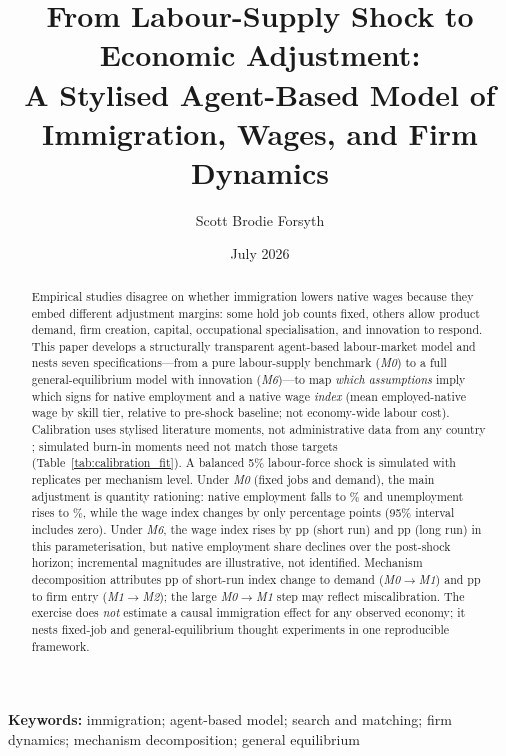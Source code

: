 \documentclass[11pt,a4paper]{article}
\title{%
  From Labour-Supply Shock to Economic Adjustment:\\
  A Stylised Agent-Based Model of Immigration, Wages, and Firm Dynamics}
\author{Scott Brodie Forsyth}
\date{July 2026}
\begin{document}
\maketitle



\begin{abstract}
\noindent
Empirical studies disagree on whether immigration lowers native wages because they embed different adjustment margins: some hold job counts fixed, others allow product demand, firm creation, capital, occupational specialisation, and innovation to respond.
This paper develops a structurally transparent agent-based labour-market model and nests seven specifications---from a pure labour-supply benchmark (\emph{M0}) to a full general-equilibrium model with innovation (\emph{M6})---to map \emph{which assumptions} imply which signs for native employment and a native wage \emph{index} (mean employed-native wage by skill tier, relative to pre-shock baseline; not economy-wide labour cost).
Calibration uses stylised literature moments, not administrative data from any country \citep{borjas2016,dustmann2013,oecd2024entrepreneurship,peri2016}; simulated burn-in moments need not match those targets (Table~\ref{tab:calibration_fit}).
A balanced 5\% labour-force shock is simulated with \NReplicates{} replicates per mechanism level.
Under \emph{M0} (fixed jobs and demand), the main adjustment is quantity rationing: native employment falls to \MZeroEmpShort{}\% and unemployment rises to \MZeroUnempShort{}\%, while the wage index changes by only \MZeroShortWage{} percentage points (95\% interval includes zero).
Under \emph{M6}, the wage index rises by \MSixShortWage{} pp (short run) and \MSixLongWage{} pp (long run) in this parameterisation, but native employment share declines over the post-shock horizon; incremental magnitudes are illustrative, not identified.
Mechanism decomposition attributes \DemandContrib{} pp of short-run index change to demand (\emph{M0}$\rightarrow$\emph{M1}) and \EntryContrib{} pp to firm entry (\emph{M1}$\rightarrow$\emph{M2}); the large \emph{M0}$\rightarrow$\emph{M1} step may reflect miscalibration.
The exercise does \emph{not} estimate a causal immigration effect for any observed economy; it nests fixed-job and general-equilibrium thought experiments in one reproducible framework.
\end{abstract}

\noindent\textbf{Keywords:} immigration; agent-based model; search and matching; firm dynamics; mechanism decomposition; general equilibrium
\end{document}
